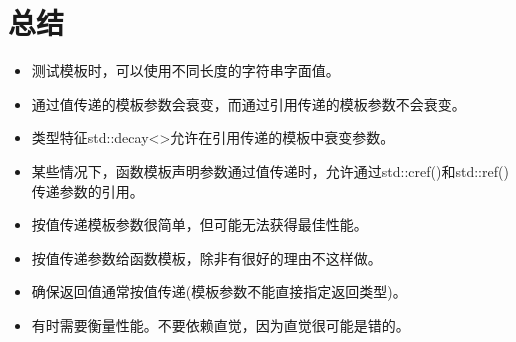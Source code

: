 \section{总结}

\begin{itemize}
\item 
测试模板时，可以使用不同长度的字符串字面值。

\item 
通过值传递的模板参数会衰变，而通过引用传递的模板参数不会衰变。

\item 
类型特征std::decay<>允许在引用传递的模板中衰变参数。

\item 
某些情况下，函数模板声明参数通过值传递时，允许通过std::cref()和std::ref()传递参数的引用。

\item 
按值传递模板参数很简单，但可能无法获得最佳性能。

\item 
按值传递参数给函数模板，除非有很好的理由不这样做。

\item 
确保返回值通常按值传递(模板参数不能直接指定返回类型)。

\item 
有时需要衡量性能。不要依赖直觉，因为直觉很可能是错的。
\end{itemize}